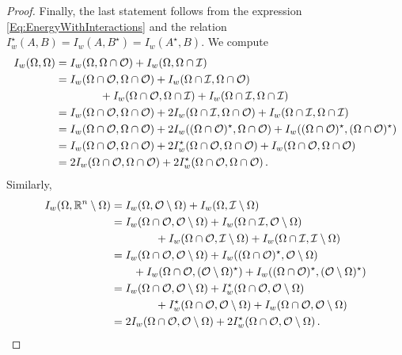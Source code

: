 \begin{proof}
Finally, the last statement follows from the expression \eqref{Eq:EnergyWithInteractions} and the relation $I^\star_w(A,B) = I_w(A,B^\star) = I_w(A^\star,B)$. We compute
\begin{align*}
I_w(\Omega, \Omega) &= I_w(\Omega, \Omega\cap \mathcal{O}) + I_w(\Omega, \Omega\cap \mathcal{I}) \\
&= I_w(\Omega\cap \mathcal{O}, \Omega\cap \mathcal{O}) + I_w(\Omega\cap \mathcal{I}, \Omega\cap \mathcal{O}) \\
&  \qquad \qquad + I_w(\Omega\cap \mathcal{O}, \Omega\cap \mathcal{I}) + I_w(\Omega\cap \mathcal{I}, \Omega\cap \mathcal{I}) \\
&= I_w(\Omega\cap \mathcal{O}, \Omega\cap \mathcal{O}) + 2 I_w(\Omega\cap \mathcal{I}, \Omega\cap \mathcal{O})  + I_w(\Omega\cap \mathcal{I}, \Omega\cap \mathcal{I}) \\
&= I_w(\Omega\cap \mathcal{O}, \Omega\cap \mathcal{O}) + 2I_w((\Omega\cap \mathcal{O})^\star, \Omega\cap \mathcal{O}) + I_w((\Omega\cap \mathcal{O})^\star, (\Omega\cap \mathcal{O})^\star) \\
&= I_w(\Omega\cap \mathcal{O}, \Omega\cap \mathcal{O}) + 2I_w^\star(\Omega\cap \mathcal{O}, \Omega\cap \mathcal{O}) + I_w(\Omega\cap \mathcal{O}, \Omega\cap \mathcal{O}) \\
&=  2 I_w(\Omega\cap \mathcal{O}, \Omega\cap \mathcal{O}) + 2I_w^\star(\Omega\cap \mathcal{O}, \Omega\cap \mathcal{O})\,.
\end{align*}
Similarly,
\begin{align*}
I_w(\Omega, \mathbb{R}^n\setminus \Omega) &= I_w(\Omega,  \mathcal{O} \setminus \Omega) + I_w(\Omega,\mathcal{I} \setminus \Omega) \\
&= I_w(\Omega\cap \mathcal{O}, \mathcal{O} \setminus \Omega) + I_w(\Omega\cap \mathcal{I}, \mathcal{O} \setminus \Omega) \\
&  \qquad \qquad + I_w(\Omega\cap \mathcal{O}, \mathcal{I} \setminus \Omega) + I_w(\Omega\cap \mathcal{I}, \mathcal{I} \setminus \Omega) \\
&= I_w(\Omega\cap \mathcal{O}, \mathcal{O} \setminus \Omega) + I_w((\Omega\cap \mathcal{O})^\star, \mathcal{O} \setminus \Omega) \\
&  \quad \quad + I_w(\Omega\cap \mathcal{O}, (\mathcal{O} \setminus \Omega)^\star) + I_w((\Omega\cap \mathcal{O})^\star, (\mathcal{O} \setminus \Omega)^\star) \\
&= I_w(\Omega\cap \mathcal{O}, \mathcal{O} \setminus \Omega) + I_w^\star(\Omega\cap \mathcal{O}, \mathcal{O} \setminus \Omega) \\
&  \qquad \qquad + I_w^\star(\Omega\cap \mathcal{O}, \mathcal{O} \setminus \Omega) + I_w(\Omega\cap \mathcal{O}, \mathcal{O} \setminus \Omega) \\
&= 2 I_w(\Omega\cap \mathcal{O}, \mathcal{O} \setminus \Omega) + 2I_w^\star(\Omega\cap \mathcal{O}, \mathcal{O} \setminus \Omega) \,.
\end{align*}
\end{proof}

